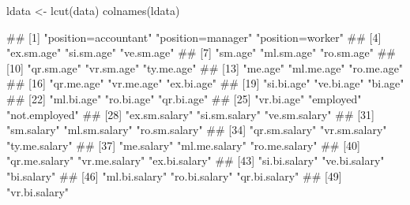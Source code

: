 \begin{Schunk}
% --begin: "casestudy-assoc-lcut"
\begin{Sinput}
ldata <- lcut(data)
colnames(ldata)
\end{Sinput}
\begin{Soutput}
##  [1] "position=accountant" "position=manager"    "position=worker"    
##  [4] "ex.sm.age"           "si.sm.age"           "ve.sm.age"          
##  [7] "sm.age"              "ml.sm.age"           "ro.sm.age"          
## [10] "qr.sm.age"           "vr.sm.age"           "ty.me.age"          
## [13] "me.age"              "ml.me.age"           "ro.me.age"          
## [16] "qr.me.age"           "vr.me.age"           "ex.bi.age"          
## [19] "si.bi.age"           "ve.bi.age"           "bi.age"             
## [22] "ml.bi.age"           "ro.bi.age"           "qr.bi.age"          
## [25] "vr.bi.age"           "employed"            "not.employed"       
## [28] "ex.sm.salary"        "si.sm.salary"        "ve.sm.salary"       
## [31] "sm.salary"           "ml.sm.salary"        "ro.sm.salary"       
## [34] "qr.sm.salary"        "vr.sm.salary"        "ty.me.salary"       
## [37] "me.salary"           "ml.me.salary"        "ro.me.salary"       
## [40] "qr.me.salary"        "vr.me.salary"        "ex.bi.salary"       
## [43] "si.bi.salary"        "ve.bi.salary"        "bi.salary"          
## [46] "ml.bi.salary"        "ro.bi.salary"        "qr.bi.salary"       
## [49] "vr.bi.salary"
\end{Soutput}
%
% --end: "casestudy-assoc-lcut"
\end{Schunk}
